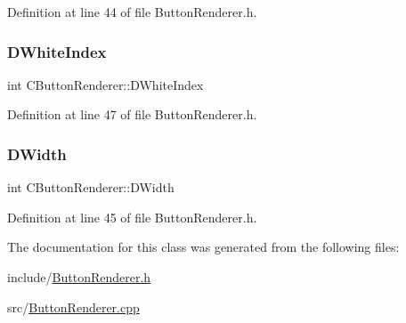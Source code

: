 Definition at line 44 of file Button\+Renderer.\+h.

\hypertarget{classCButtonRenderer_a931258275773c59f73b769ec0574b615}{}\label{classCButtonRenderer_a931258275773c59f73b769ec0574b615} 
\subsubsection{\texorpdfstring{D\+White\+Index}{DWhiteIndex}}
{\footnotesize\ttfamily int C\+Button\+Renderer\+::\+D\+White\+Index\hspace{0.3cm}{\ttfamily [protected]}}



Definition at line 47 of file Button\+Renderer.\+h.

\hypertarget{classCButtonRenderer_a5c2ce68af06e91c14cbd1b8dd8bd4b94}{}\label{classCButtonRenderer_a5c2ce68af06e91c14cbd1b8dd8bd4b94} 
\subsubsection{\texorpdfstring{D\+Width}{DWidth}}
{\footnotesize\ttfamily int C\+Button\+Renderer\+::\+D\+Width\hspace{0.3cm}{\ttfamily [protected]}}



Definition at line 45 of file Button\+Renderer.\+h.



The documentation for this class was generated from the following files\+:\begin{DoxyCompactItemize}
\item 
include/\hyperlink{ButtonRenderer_8h}{Button\+Renderer.\+h}\item 
src/\hyperlink{ButtonRenderer_8cpp}{Button\+Renderer.\+cpp}\end{DoxyCompactItemize}
